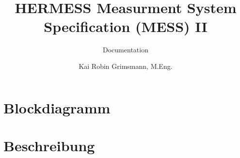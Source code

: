 \documentclass{scrreprt}
\title{HERMESS Measurment System Specification (MESS) II }
\subtitle{Documentation}\author{Kai Robin Grimsmann, M.Eng.}
\begin{document}

\thispagestyle{empty}
\tableofcontents 
\pagebreak
\chapter{Blockdiagramm}




\chapter{Beschreibung}



\end{document}
